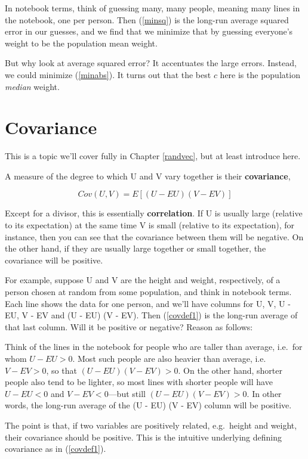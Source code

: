 In notebook terms, think of guessing many, many people, meaning many
lines in the notebook, one per person.  Then (\ref{minsq}) is the
long-run average squared error in our guesses, and we find that we
minimize that by guessing everyone's weight to be the population mean
weight.

But why look at average squared error?  It accentuates the large errors.
Instead, we could minimize (\ref{minabs}).  It turns out that the best
$c$ here is the population {\it median} weight.

\section{Covariance} 

This is a topic we'll cover fully in Chapter \ref{randvec}, but at least
introduce here.

A measure of the degree to which U and V vary together is their {\bf
covariance},

\begin{equation}
\label{covdef1}
Cov(U,V) = E[(U-EU)(V-EV)]
\end{equation}

Except for a divisor, this is essentially {\bf correlation}.  If U is
usually large (relative to its expectation) at the same time V is
small (relative to its expectation), for instance, then you can
see that the covariance between them will be negative.  On the other
hand, if they are usually large together or small together, the
covariance will be positive.

For example, suppose U and V are the height and weight, respectively, of
a person chosen at random from some population, and think in notebook
terms.  Each line shows the data for one person, and we'll have columns
for U, V, U - EU, V - EV and (U - EU) (V - EV).  Then (\ref{covdef1}) is
the long-run average of that last column.  Will it be positive or
negative?  Reason as follows:

Think of the lines in the notebook for people who are taller than
average, i.e.\ for whom $U - EU > 0$.  Most such people are also heavier
than average, i.e.\ $V - EV > 0$, so that $(U - EU) (V - EV) > 0$.  
On the other hand, shorter people also tend to be lighter, so most lines
with shorter people will have $U - EU <0$ and $V -EV < 0$---but still
$(U - EU) (V - EV) > 0$.  In other words, the long-run average of the (U
- EU) (V - EV) column will be positive.

The point is that, if two variables are positively related, e.g.\ height
and weight, their covariance should be positive.  This is the intuitive
underlying defining covariance as in (\ref{covdef1}).


